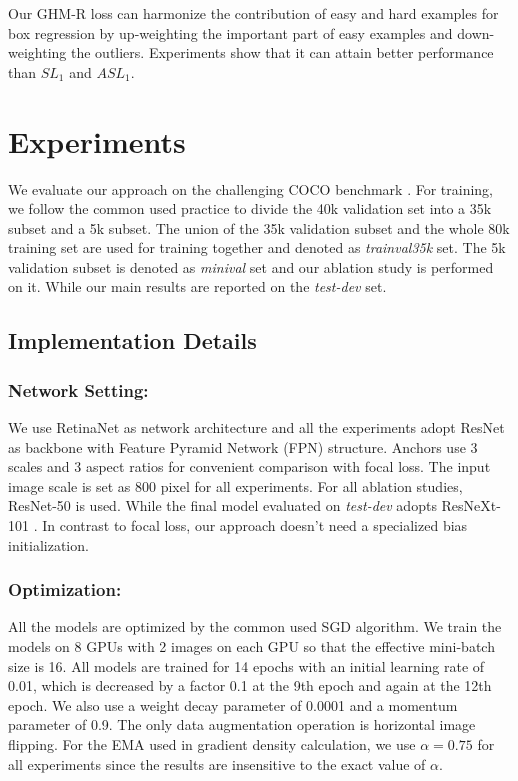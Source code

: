 \documentclass[letterpaper]{article} \usepackage{aaai19}  \usepackage{times}  \usepackage{helvet}  \usepackage{courier}  \usepackage{url}  \usepackage{graphicx}  \usepackage{amsmath,amssymb}
\begin{document}
Our GHM-R loss can harmonize the contribution of easy and hard examples for box regression by up-weighting the important part of easy examples and down-weighting the outliers.
Experiments show that it can attain better performance than $SL_1$ and $ASL_1$.



\section{Experiments}
We evaluate our approach on the challenging COCO benchmark \cite{coco}. For training, we follow the common used practice \cite{mask,focal} to divide the 40k validation set into a 35k subset and a 5k subset. The union of the 35k validation subset and the whole 80k training set are used for training together and denoted as \textit{trainval35k} set. The 5k validation subset is denoted as \textit{minival} set and our ablation study is performed on it. While our main results are reported on the \textit{test-dev} set.

\subsection{Implementation Details}
\subsubsection{Network Setting:} We use RetinaNet \cite{focal} as  network architecture and all the experiments adopt ResNet \cite{resnet} as backbone with Feature Pyramid Network (FPN) \cite{fpn} structure. Anchors use 3 scales and 3 aspect ratios for convenient comparison with focal loss. The input image scale is set as 800 pixel for all experiments. For all ablation studies, ResNet-50 is used. While the final model evaluated on \textit{test-dev} adopts ResNeXt-101 \cite{resnext}. In contrast to focal loss, our approach doesn't need a specialized bias initialization.

\subsubsection{Optimization:} All the models are optimized by the common used SGD algorithm. We train the models on 8 GPUs with 2 images on each GPU so that the effective mini-batch size is 16. All models are trained for 14 epochs with an initial learning rate of 0.01, which is decreased by a factor 0.1 at the 9th epoch and again at the 12th epoch. We also use a weight decay parameter of 0.0001 and a momentum parameter of 0.9. The only data augmentation operation is horizontal image flipping. For the EMA used in gradient density calculation, we use $\alpha=0.75$ for all experiments since the results are insensitive to the exact value of $\alpha$.
\end{document}
